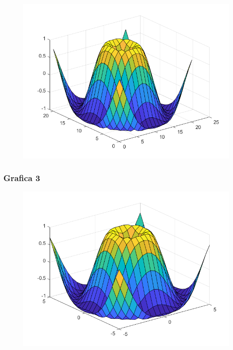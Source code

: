 \documentclass{article}
\begin{document}
	\begin{figure}[h]
		\centering
		\includegraphics[width=\textwidth]{grafica22b.png}
	\end{figure}
	
	\newpage
	
	\subsubsection{Grafica 3}
	
	\begin{figure}[h]
		\centering
		\includegraphics[width=\textwidth]{grafica22c.png}
	\end{figure}
	
	\newpage
	
\end{document}
